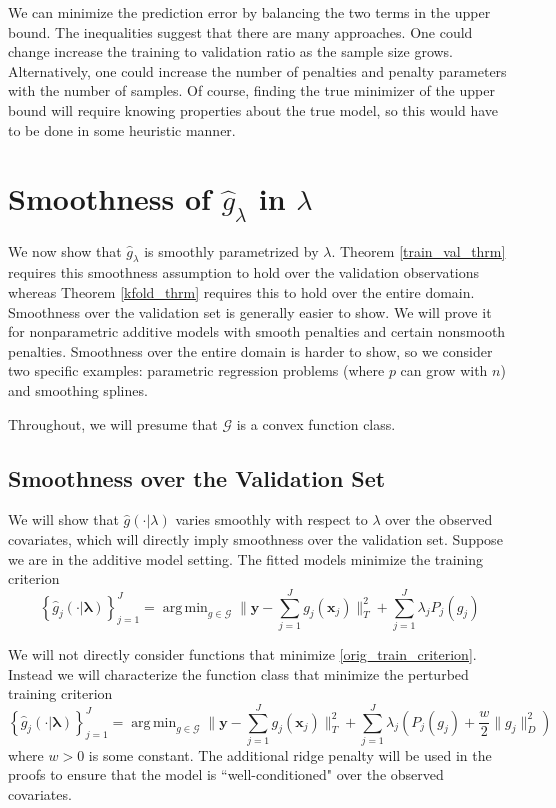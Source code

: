 \documentclass[12pt]{article}
\DeclareMathOperator*{\argmin}{arg\,min}
\begin{document}
We can minimize the prediction error by balancing the two terms in the upper bound. The inequalities suggest that there are many approaches. One could change increase the training to validation ratio as the sample size grows. Alternatively, one could increase the number of penalties and penalty parameters with the number of samples. Of course, finding the true minimizer of the upper bound will require knowing properties about the true model, so this would have to be done in some heuristic manner.

\section{Smoothness of $\hat{g}_\lambda$ in $\lambda$}
\label{sec:entropy}

We now show that $\hat{g}_\lambda$ is smoothly parametrized by $\lambda$. Theorem \ref{train_val_thrm} requires this smoothness assumption to hold over the validation observations whereas Theorem \ref{kfold_thrm} requires this to hold over the entire domain. Smoothness over the validation set is generally easier to show. We will prove it for nonparametric additive models with smooth penalties and certain nonsmooth penalties. Smoothness over the entire domain is harder to show, so we consider two specific examples: parametric regression problems (where $p$ can grow with $n$) and smoothing splines.

Throughout, we will presume that $\mathcal{G}$ is a convex function class.

\subsection{Smoothness over the Validation Set}
\label{sec:smoothness_validation}
We will show that $\hat{g}(\cdot | \lambda)$ varies smoothly with respect to $\lambda$ over the observed covariates, which will directly imply smoothness over the validation set. Suppose we are in the additive model setting. The fitted models minimize the training criterion
\begin{equation}
\label{orig_train_criterion}
\left\{ \hat{g}_j(\cdot | \boldsymbol \lambda) \right \}_{j=1}^J = \argmin_{g\in \mathcal{G}} \| \boldsymbol y -  \sum_{j=1}^J g_j(\boldsymbol x_j) \|^2_T + \sum_{j=1}^J \lambda_j P_j(g_j)
\end{equation}

We will not directly consider functions that minimize \eqref{orig_train_criterion}. Instead we will characterize the function class that minimize the perturbed training criterion
\begin{equation}
\label{train_crit_ridge}
\left\{ \hat{g}_j(\cdot | \boldsymbol \lambda) \right \}_{j=1}^J = \argmin_{g\in \mathcal{G}} \| \boldsymbol y -  \sum_{j=1}^J g_j(\boldsymbol x_j) \|^2_T + \sum_{j=1}^J \lambda_j \left ( P_j(g_j) + \frac{w}{2} \| g_j \|^2_D \right )
\end{equation}
where $w > 0$ is some constant. The additional ridge penalty will be used in the proofs to ensure that the model is ``well-conditioned" over the observed covariates.
\end{document}
